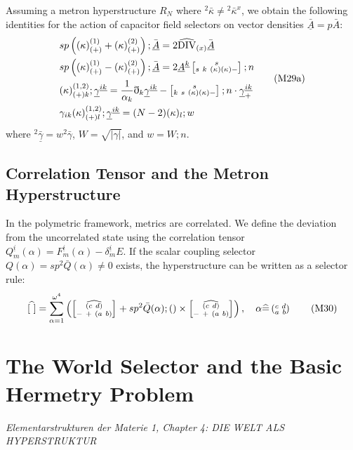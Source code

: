 \documentclass[11pt,a4paper,oneside]{article}
\newcommand{\ethop}{\eth}
\newcommand{\metroncap}[4][]{%
    \left[ \renewcommand{\arraystretch}{0.85} \substack{#2 \\ #3 \ #4} \right]_{#1}%
}
\begin{document}
Assuming a metron hyperstructure $R_N$ where ${}^2\bar{\kappa} \neq {}^2\bar{\kappa}^x$, we obtain the following identities for the action of capacitor field selectors on vector densities $\bar{\underline{A}} = p\bar{A}$:
\begin{equation}
\begin{split}
    &sp\left((\kappa)^{(1)}_{(+)}+(\kappa)^{(2)}_{(+)}\right);\bar{\underline{A}} = 2\widehat{\rm{DIV}}_{(x)} \bar{\underline{A}} \\
    &sp\left((\kappa)^{(1)}_{(+)}-(\kappa)^{(2)}_{(+)}\right);\bar{\underline{A}} = 2\underline{A}^{\underline{k}} \metroncap{s}{s\ k}{(\kappa)(\kappa)-}; n \\
    &(\kappa)^{(1,2)}_{(+)k};\underline{\gamma}^{\underline{ik}} = \frac{1}{\alpha_k} \ethop_k \underline{\gamma}^{\underline{ik}} - \metroncap{s}{k\ s}{(\kappa)(\kappa)-}; n \cdot \underline{\gamma}^{\underline{ik}}_+ \\
    &\gamma_{ik}(\kappa)^{(1,2)}_{(+)l};\underline{\gamma}^{\underline{ik}} = (N-2) (\kappa)_l; w
\end{split} \tag{M29a}
\end{equation}
where ${}^2\bar{\underline{\gamma}} = w^2\bar{\gamma}$, $W = \sqrt{|\gamma|}$, and $w = W;n$.

\subsection{Correlation Tensor and the Metron Hyperstructure}

In the polymetric framework, metrics are correlated. We define the deviation from the uncorrelated state using the correlation tensor $Q^{\underline{i}}_m(\alpha) = F^{\underline{i}}_m(\alpha) - \delta^{\underline{i}}_m E$. If the scalar coupling selector $Q(\alpha) = sp {}^2\bar{Q}(\alpha) \neq 0$ exists, the hyperstructure can be written as a selector rule:
\begin{equation}
    \widehat{[\ ]} = \sum_{\alpha=1}^{\omega^4} \left( \metroncap{\widehat{(c\ d)}}{-\ +}{(a\ b)} + sp {}^2\bar{Q}(\alpha); () \times \metroncap{\widehat{(c\ d)}}{-\ +}{(a\ b)} \right), \quad \alpha \widehat{=} \left( \substack{c\ d \\ a\ b} \right) \tag{M30}
\end{equation}

\section{The World Selector and the Basic Hermetry Problem}
\textit{Elementarstrukturen der Materie 1, Chapter 4: DIE WELT ALS HYPERSTRUKTUR}
\end{document}
